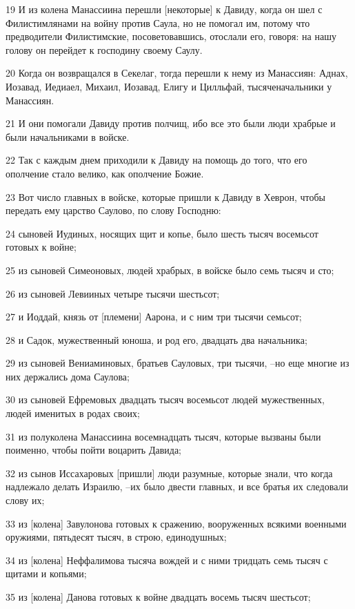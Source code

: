\par 19 И из колена Манассиина перешли [некоторые] к Давиду, когда он шел с Филистимлянами на войну против Саула, но не помогал им, потому что предводители Филистимские, посоветовавшись, отослали его, говоря: на нашу голову он перейдет к господину своему Саулу.
\par 20 Когда он возвращался в Секелаг, тогда перешли к нему из Манассиян: Аднах, Иозавад, Иедиаел, Михаил, Иозавад, Елигу и Цилльфай, тысяченачальники у Манассиян.
\par 21 И они помогали Давиду против полчищ, ибо все это были люди храбрые и были начальниками в войске.
\par 22 Так с каждым днем приходили к Давиду на помощь до того, что его ополчение стало велико, как ополчение Божие.
\par 23 Вот число главных в войске, которые пришли к Давиду в Хеврон, чтобы передать ему царство Саулово, по слову Господню:
\par 24 сыновей Иудиных, носящих щит и копье, было шесть тысяч восемьсот готовых к войне;
\par 25 из сыновей Симеоновых, людей храбрых, в войске было семь тысяч и сто;
\par 26 из сыновей Левииных четыре тысячи шестьсот;
\par 27 и Иоддай, князь от [племени] Аарона, и с ним три тысячи семьсот;
\par 28 и Садок, мужественный юноша, и род его, двадцать два начальника;
\par 29 из сыновей Вениаминовых, братьев Сауловых, три тысячи, --но еще многие из них держались дома Саулова;
\par 30 из сыновей Ефремовых двадцать тысяч восемьсот людей мужественных, людей именитых в родах своих;
\par 31 из полуколена Манассиина восемнадцать тысяч, которые вызваны были поименно, чтобы пойти воцарить Давида;
\par 32 из сынов Иссахаровых [пришли] люди разумные, которые знали, что когда надлежало делать Израилю, --их было двести главных, и все братья их следовали слову их;
\par 33 из [колена] Завулонова готовых к сражению, вооруженных всякими военными оружиями, пятьдесят тысяч, в строю, единодушных;
\par 34 из [колена] Неффалимова тысяча вождей и с ними тридцать семь тысяч с щитами и копьями;
\par 35 из [колена] Данова готовых к войне двадцать восемь тысяч шестьсот;
